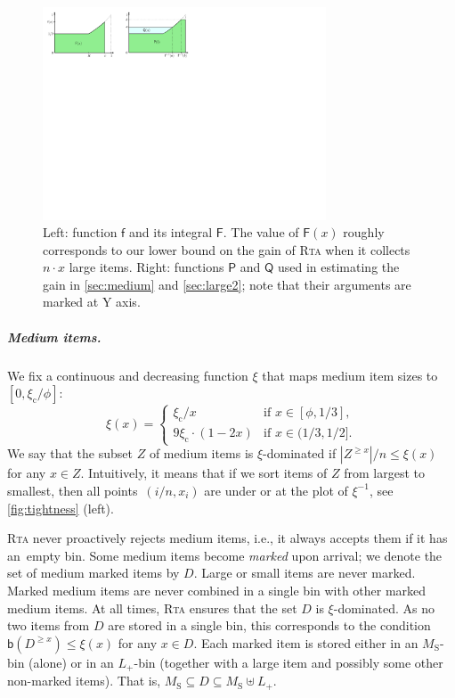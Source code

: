 \documentclass[a4paper,USenglish,cleveref]{lipics-v2019}
\newcommand{\M}{\ensuremath{M_\mathrm{S}}\xspace}
\newcommand{\LT}{\ensuremath{L_+}\xspace}
\newcommand{\D}{\ensuremath{D}\xspace}
\newcommand{\smallBoundary}{\ensuremath{\phi}}
\newcommand{\gconst}{\ensuremath{\xi_\mathrm{c}}}
\newcommand{\f}{\textsf{f}}
\newcommand{\g}{\ensuremath{\xi}}
\newcommand{\fintegral}{\textsf{F}}
\newcommand{\water}{\textsf{Q}}
\newcommand{\cutintegral}{\textsf{P}}
\newcommand{\B}{\textsf{b}}
\newcommand{\ALG}{\textsc{Rta}\xspace}
\begin{document}
\begin{figure}[t]
   \centering
   \includegraphics[width=0.75\textwidth]{images/pq.pdf}
   \caption{Left: function $\f$ and its integral $\fintegral$. 
   The value of $\fintegral(x)$ roughly corresponds to our lower bound on the 
   gain of \ALG when it collects $n \cdot x$ large items.
   Right: functions $\cutintegral$ and $\water$ used in estimating the gain 
   in \cref{sec:medium} and \cref{sec:large2}; note that their arguments are marked at Y axis.}
   \label{fig:def-fpq} 
\end{figure}



\subparagraph{Medium items.}

We fix a continuous and decreasing function $\g$ that maps medium item sizes 
to $[0,\gconst/\smallBoundary]$:
\begin{equation}
\label{eq:g-definition}
\g(x) =
\begin{cases}
  \gconst / x & \text{if $x \in [\smallBoundary,1/3]$}, \\
  9 \gconst \cdot (1-2 x) & \text{if $x \in (1/3,1/2]$}. 
\end{cases} 
\end{equation}
We say that the subset $Z$ of medium items is
$\g$-dominated if $|Z^{\geq x}| / n \leq \g(x)$ for any $x \in Z$.
Intuitively, it means that if we sort items of $Z$ from largest to
smallest, then all points~$(i/n, x_i)$ are under or at the plot of $\g^{-1}$,
see \cref{fig:tightness} (left). 

\ALG never proactively rejects medium items, i.e., it always accepts them if it 
has an~empty bin. Some medium items become \emph{marked} upon
arrival; we denote the set of medium marked items by $D$. Large or small items
are never marked. Marked medium items are never combined in a single bin with
other marked medium items. At all times, \ALG ensures that the set $D$ is
$\g$-dominated. As no two items from $D$ are stored in a single bin, this
corresponds to the condition $\B(D^{\geq x}) \leq \g(x)$ for any $x \in D$.
Each marked item is stored either in an $\M$-bin (alone) or in an $\LT$-bin (together 
with a large item and possibly some other non-marked items).
That is, $\M \subseteq \D \subseteq \M \uplus \LT$.
\end{document}
